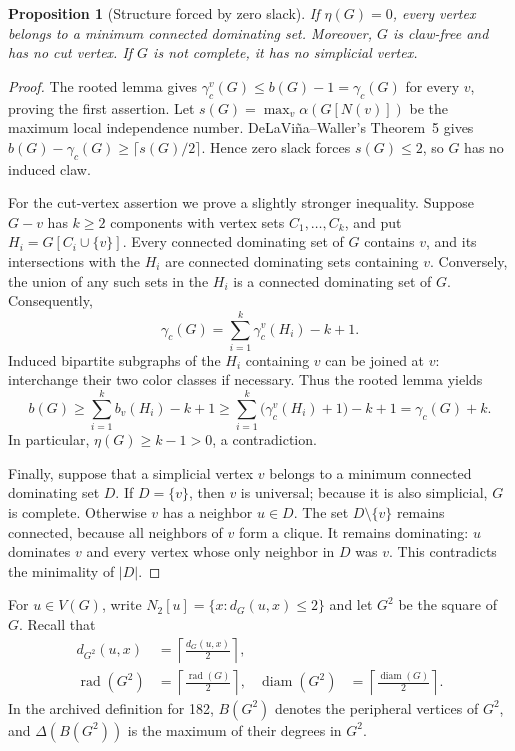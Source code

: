 \documentclass[11pt,a4paper]{article}
\newtheorem{proposition}[theorem]{Proposition}
\theoremstyle{remark}
\begin{document}
\begin{proposition}[Structure forced by zero slack]
\label{r8:prop-zero-slack}
If $\eta(G)=0$, every vertex belongs to a minimum connected dominating
set.  Moreover, $G$ is claw-free and has no cut vertex.  If $G$ is not
complete, it has no simplicial vertex.
\end{proposition}
\begin{proof}
The rooted lemma gives
$\gamma_c^v(G)\le b(G)-1=\gamma_c(G)$ for every $v$, proving the first
assertion.  Let ${s(G)}=\max_v\alpha(G[N(v)])$ be the maximum local
independence number.  DeLaVi\~na--Waller's Theorem~5 gives
$b(G)-\gamma_c(G)\ge\lceil{s(G)}/2\rceil$.  Hence zero slack forces
${s(G)}\le2$, so $G$ has no induced claw.

For the cut-vertex assertion we prove a slightly stronger inequality.
Suppose $G-v$ has $k\ge2$ components with vertex sets $C_1,\ldots,C_k$,
and put $H_i=G[C_i\cup\{v\}]$.  Every connected dominating set of $G$
contains $v$, and its intersections with the $H_i$ are connected
dominating sets containing $v$.  Conversely, the union of any such
sets in the $H_i$ is a connected dominating set of $G$.  Consequently,
\[
 \gamma_c(G)=\sum_{i=1}^k\gamma_c^v(H_i)-k+1.
\]
Induced bipartite subgraphs of the $H_i$ containing $v$ can be joined
at $v$: interchange their two color classes if necessary.  Thus the
rooted lemma yields
\[
 b(G)\ge\sum_{i=1}^k b_v(H_i)-k+1
       \ge\sum_{i=1}^k\bigl(\gamma_c^v(H_i)+1\bigr)-k+1
       =\gamma_c(G)+k.
\]
In particular, $\eta(G)\ge k-1>0$, a contradiction.

Finally, suppose that a simplicial vertex $v$ belongs to a minimum
connected dominating set $D$.  If $D=\{v\}$, then $v$ is universal;
because it is also simplicial, $G$ is complete.  Otherwise $v$ has a
neighbor $u\in D$.  The set $D\setminus\{v\}$ remains connected,
because all neighbors of $v$ form a clique.  It remains dominating:
$u$ dominates $v$ and every vertex whose only neighbor in $D$ was $v$.
This contradicts the minimality of $|D|$.
\end{proof}

For $u\in V(G)$, write
$N_2[u]=\{x:d_G(u,x)\le2\}$ and let $G^2$ be the square of $G$.
Recall that
\begin{align*}
 d_{G^2}(u,x)&=\left\lceil\frac{d_G(u,x)}2\right\rceil,\\
 \operatorname{rad}(G^2)&=\left\lceil\frac{\operatorname{rad}(G)}2\right\rceil, &
 \operatorname{diam}(G^2)&=\left\lceil\frac{\operatorname{diam}(G)}2\right\rceil.
\end{align*}
In the archived definition for 182, $B(G^2)$ denotes the peripheral
vertices of $G^2$, and $\Delta(B(G^2))$ is the maximum of their
degrees in $G^2$.
\end{document}
